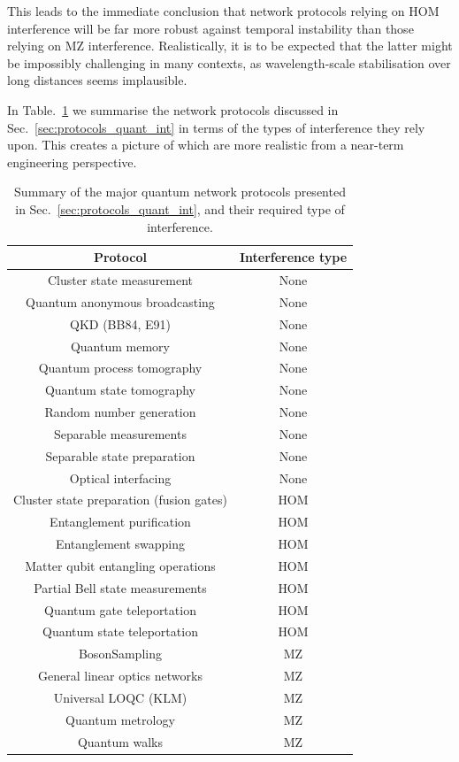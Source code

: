 \documentclass[aps, rmp, twocolumn, amsmath, amssymb, nofootinbib, superscriptaddress, longbibliography, floatfix, table-of-contents, eqsecnum]{revtex4-1}
\begin{document}
This leads to the immediate conclusion that network protocols relying on HOM interference will be far more robust against temporal instability than those relying on MZ interference. Realistically, it is to be expected that the latter might be impossibly challenging in many contexts, as wavelength-scale stabilisation over long distances seems implausible.

In Table.~\ref{table:summary_inter} we summarise the network protocols discussed in Sec.~\ref{sec:protocols_quant_int} in terms of the types of interference they rely upon. This creates a picture of which are more realistic from a near-term engineering perspective.

\begin{table}[!htb]
	\begin{tabular}{|c|c|}
		\hline
  		Protocol & Interference type \\
  		\hline
  		\hline
  		Cluster state measurement & None \\
   		Quantum anonymous broadcasting & None \\
  		QKD (BB84, E91) & None \\
  		Quantum memory & None \\
  		Quantum process tomography & None \\
  		Quantum state tomography & None \\
  		Random number generation & None \\
  		Separable measurements & None \\
  		Separable state preparation & None \\
  		Optical interfacing & None \\
  		\hline
  		Cluster state preparation (fusion gates) & HOM \\
  		Entanglement purification & HOM \\
  		Entanglement swapping & HOM \\ 
  		Matter qubit entangling operations & HOM \\
  		Partial Bell state measurements & HOM \\
   		Quantum gate teleportation & HOM \\
  		Quantum state teleportation & HOM \\
  		\hline
  		{\sc BosonSampling} & MZ \\
  		General linear optics networks & MZ \\
  		Universal LOQC (KLM) & MZ \\
  		Quantum metrology & MZ \\
  		Quantum walks & MZ \\
    	\hline
	\end{tabular}
	\caption{Summary of the major quantum network protocols presented in Sec.~\ref{sec:protocols_quant_int}, and their required type of interference.}\label{table:summary_inter}
\end{table}
\end{document}
